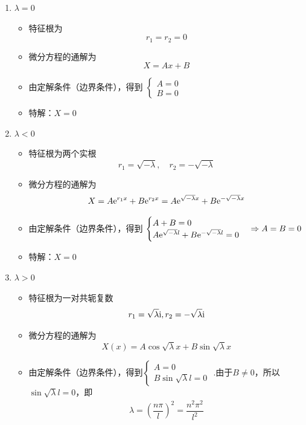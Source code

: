 \begin{enumerate}
	\item $\lambda = 0$
	\begin{itemize}
		\item 特征根为
		\begin{equation*}
			r_1 = r_2 = 0
		\end{equation*}
		\item 微分方程的通解为
		\begin{equation}
			X = Ax + B
		\end{equation}
	\item 由定解条件（边界条件），得到
	$
	\begin{cases}
		A = 0\\
		B = 0
	\end{cases}
	$
	\item 特解：$X = 0$
	\end{itemize}
\item $\lambda < 0$
\begin{itemize}
	\item 特征根为两个实根
	\begin{equation*}
		r_1 = \sqrt{- \lambda }, \quad  r_2 = -  \sqrt{- \lambda }
	\end{equation*}
	\item 微分方程的通解为
	\begin{equation}
		X = A{\rm{e}}^{r_1x}+B{\rm{e}}^{r_2x} = A{\rm{e}}^{\sqrt{- \lambda }x}+B{\rm{e}}^{-\sqrt{- \lambda }x} 
	\end{equation}
	\item 由定解条件（边界条件），得到
	$
	\begin{cases}
		A + B= 0\\
		A{\rm{e}}^{\sqrt{- \lambda }l}+B{\rm{e}}^{-\sqrt{- \lambda }l}  = 0
	\end{cases}
\Rightarrow A = B = 0
	$
	\item  特解：$X = 0$
\end{itemize}
\item $\lambda > 0 $
\begin{itemize}
	\item 特征根为一对共轭复数
	\begin{equation*}
		r_1 = \sqrt{\lambda}{\rm{i}} , r_2 = -\sqrt{\lambda} {\rm{i}}
	\end{equation*}
	\item 微分方程的通解为
	\begin{equation}
		X(x) = A \cos \sqrt{\lambda}x + B \sin \sqrt{\lambda}x
	\end{equation}
	\item 由定解条件（边界条件），得到$\begin{cases}
		A = 0\\
		B \sin \sqrt{\lambda} l = 0 
	\end{cases}$
.由于$B \neq 0$，所以$\sin \sqrt{\lambda} l =0$，即
\begin{align}
	\lambda = \left(\dfrac{n \pi}{l}\right)^2 = \dfrac{n^2 \pi^2}{l^2}
\end{align}
\end{itemize}
\end{enumerate}
